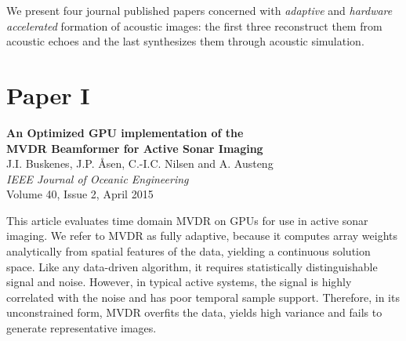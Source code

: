 %
% 


We present four journal published papers concerned with \emph{adaptive} and \emph{hardware accelerated} formation of acoustic images: the first three reconstruct them from acoustic echoes and the last synthesizes them through acoustic simulation. 

%
%


%

\section{Paper I}\label{sec:paperI} %
\textbf{An Optimized GPU implementation of the\\ MVDR Beamformer for Active Sonar Imaging}\\
J.I. Buskenes, J.P. Åsen, C.-I.C. Nilsen and A. Austeng\\
\textit{IEEE Journal of Oceanic Engineering}\\
Volume 40, Issue 2, April 2015

This article evaluates time domain MVDR on GPUs for use in active sonar imaging. We refer to MVDR as fully adaptive, because it computes array weights analytically from spatial features of the data, yielding a continuous solution space. Like any data-driven algorithm, it requires statistically distinguishable signal and noise. However, in typical active systems, the signal is highly correlated with the noise and has poor temporal sample support. Therefore, in its unconstrained form, MVDR overfits the data, yields high variance and fails to generate representative images.


